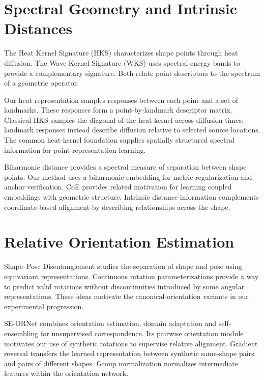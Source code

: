 \section{Spectral Geometry and Intrinsic Distances}
The Heat Kernel Signature (HKS) \citep{10.5555/1735603.1735621} characterizes shape points through heat diffusion. The Wave Kernel Signature (WKS) \citep{Aubry_2011_WKS} uses spectral energy bands to provide a complementary signature. Both relate point descriptors to the spectrum of a geometric operator.

Our heat representation samples responses between each point and a set of landmarks. These responses form a point-by-landmark descriptor matrix. Classical HKS samples the diagonal of the heat kernel across diffusion times; landmark responses instead describe diffusion relative to selected source locations. The common heat-kernel foundation supplies spatially structured spectral information for point representation learning.

Biharmonic distance \citep{Lipman_2010_Biharmonic} provides a spectral measure of separation between shape points. Our method uses a biharmonic embedding for metric regularization and anchor verification. CoE \citep{zeng2025coedeepcoupledembedding} provides related motivation for learning coupled embeddings with geometric structure. Intrinsic distance information complements coordinate-based alignment by describing relationships across the shape.

\section{Relative Orientation Estimation}
Shape--Pose Disentanglement \citep{Katzir_2022_ShapePose} studies the separation of shape and pose using equivariant representations. Continuous rotation parameterizations \citep{Zhou_2019_CVPR} provide a way to predict valid rotations without discontinuities introduced by some angular representations. These ideas motivate the canonical-orientation variants in our experimental progression.

SE-ORNet \citep{Deng_2023_CVPR} combines orientation estimation, domain adaptation and self-ensembling for unsupervised correspondence. Its pairwise orientation module motivates our use of synthetic rotations to supervise relative alignment. Gradient reversal \citep{JMLR:v17:15-239} transfers the learned representation between synthetic same-shape pairs and pairs of different shapes. Group normalization \citep{Wu_2018_GroupNorm} normalizes intermediate features within the orientation network.

